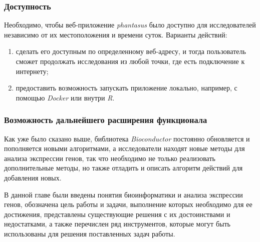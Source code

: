 \subsubsection{Доступность}
Необходимо, чтобы веб-приложение \emph{phantasus} было доступно для исследователей независимо от их местоположения и времени суток. Варианты действий:

\begin{enumerate}
\item сделать его доступным по определенному веб-адресу, и тогда пользователь сможет продолжать исследования из любой точки, где есть подключение к интернету;
\item предоставить возможность запускать приложение локально, например, с помощью \emph{Docker} или внутри \emph{R}.
\end{enumerate}

\subsubsection{Возможность дальнейшего расширения функционала}
Как уже было сказано выше, библиотека \emph{Bioconductor} постоянно обновляется и пополняется новыми алгоритмами, а исследователи находят новые методы для анализа экспрессии генов, так что необходимо не только реализовать дополнительные методы, но также отладить и описать алгоритм действий для добавления новых.

\chapterconclusion
В данной главе были введены понятия биоинформатики и анализа экспрессии генов, обозначена цель работы и задачи, выполнение которых необходимо для ее достижения, представлены существующие решения с их достоинствами и недостатками, а также перечислен ряд инструментов, которые могут быть использованы для решения поставленных задач работы.
